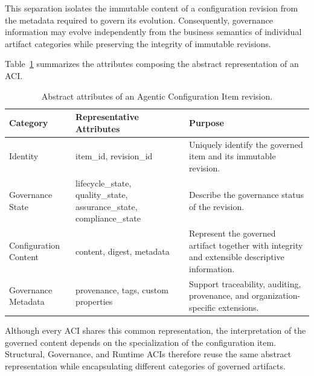 \documentclass[10pt]{article}
\begin{document}
This separation isolates the immutable content of a configuration revision from the metadata required to govern its evolution. Consequently, governance information may evolve independently from the business semantics of individual artifact categories while preserving the integrity of immutable revisions.

Table~\ref{tab:aci_attributes} summarizes the attributes composing the abstract representation of an ACI.

\begin{table}[t]
\centering
\caption{Abstract attributes of an Agentic Configuration Item revision.}
\label{tab:aci_attributes}

\renewcommand{\arraystretch}{1.15}

\begin{tabular}{p{3.3cm}p{3.4cm}p{8.3cm}}

\toprule

\textbf{Category} &
\textbf{Representative Attributes} &
\textbf{Purpose}

\\
\midrule

Identity &
item\_id, revision\_id &
Uniquely identify the governed item and its immutable revision.

\\

Governance State &
lifecycle\_state, quality\_state, assurance\_state, compliance\_state &
Describe the governance status of the revision.

\\

Configuration Content &
content, digest, metadata &
Represent the governed artifact together with integrity and extensible descriptive information.

\\

Governance Metadata &
provenance, tags, custom properties &
Support traceability, auditing, provenance, and organization-specific extensions.

\\

\bottomrule

\end{tabular}

\end{table}

Although every ACI shares this common representation, the interpretation of the governed content depends on the specialization of the configuration item. Structural, Governance, and Runtime ACIs therefore reuse the same abstract representation while encapsulating different categories of governed artifacts.
\end{document}
